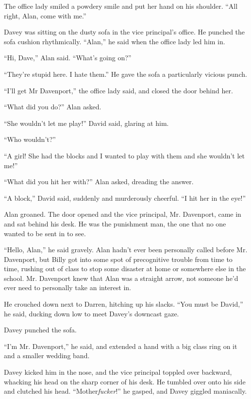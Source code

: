 \documentclass{article}
\begin{document}
The office lady smiled a powdery smile and put her hand on his
shoulder.  ``All right, Alan, come with me.''

Davey was sitting on the dusty sofa in the vice principal's office. 
He punched the sofa cushion rhythmically.  ``Alan,'' he said when the
office lady led him in.

``Hi, Dave,'' Alan said.  ``What's going on?''

``They're stupid here.  I hate them.'' He gave the sofa a particularly
vicious punch.

``I'll get Mr Davenport,'' the office lady said, and closed the door
behind her.

``What did you do?'' Alan asked.

``She wouldn't let me play!'' David said, glaring at him.

``Who wouldn't?''

``A girl!  She had the blocks and I wanted to play with them and she
wouldn't let me!''

``What did you hit her with?'' Alan asked, dreading the answer.

``A block,'' David said, suddenly and murderously cheerful.  ``I hit
her in the eye!''

Alan groaned.  The door opened and the vice principal, Mr.  Davenport,
came in and sat behind his desk.  He was the punishment man, the one
that no one wanted to be sent in to see.

``Hello, Alan,'' he said gravely.  Alan hadn't ever been personally
called before Mr.  Davenport, but Billy got into some spot of
precognitive trouble from time to time, rushing out of class to stop
some disaster at home or somewhere else in the school.  Mr.  Davenport
knew that Alan was a straight arrow, not someone he'd ever need to
personally take an interest in.

He crouched down next to Darren, hitching up his slacks.  ``You must
be David,'' he said, ducking down low to meet Davey's downcast gaze.

Davey punched the sofa.

``I'm Mr.  Davenport,'' he said, and extended a hand with a big class
ring on it and a smaller wedding band.

Davey kicked him in the nose, and the vice principal toppled over
backward, whacking his head on the sharp corner of his desk.  He
tumbled over onto his side and clutched his head. 
``Mother\textit{fucker}!'' he gasped, and Davey giggled maniacally.
\end{document}

